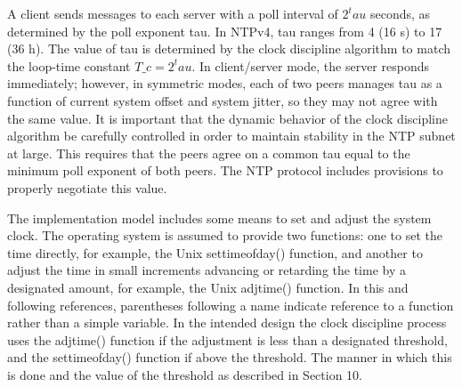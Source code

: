 A client sends messages to each server with a poll interval of $2^tau$
seconds, as determined by the poll exponent tau. In NTPv4, tau
ranges from 4 (16 s) to 17 (36 h). The value of tau is determined by
the clock discipline algorithm to match the loop-time constant $T\_c =
2^tau$. In client/server mode, the server responds immediately;
however, in symmetric modes, each of two peers manages tau as a
function of current system offset and system jitter, so they may not
agree with the same value. It is important that the dynamic behavior
of the clock discipline algorithm be carefully controlled in order to
maintain stability in the NTP subnet at large. This requires that
the peers agree on a common tau equal to the minimum poll exponent of
both peers. The NTP protocol includes provisions to properly
negotiate this value.

The implementation model includes some means to set and adjust the
system clock. The operating system is assumed to provide two
functions: one to set the time directly, for example, the Unix
settimeofday() function, and another to adjust the time in small
increments advancing or retarding the time by a designated amount,
for example, the Unix adjtime() function. In this and following
references, parentheses following a name indicate reference to a
function rather than a simple variable. In the intended design the
clock discipline process uses the adjtime() function if the
adjustment is less than a designated threshold, and the
settimeofday() function if above the threshold. The manner in which
this is done and the value of the threshold as described in
Section 10.
